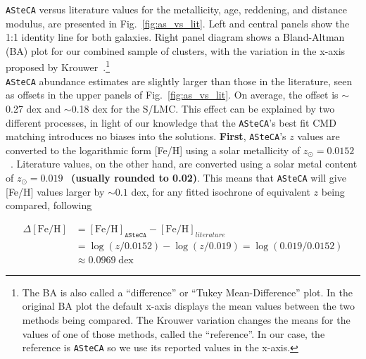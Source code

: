 \documentclass[referee]{aa}
\begin{document}
\texttt{ASteCA} versus literature values for the metallicity, age, reddening,
and distance modulus, are presented in Fig.~\ref{fig:as_vs_lit}. Left and
central panels show the 1:1 identity line for both galaxies.
%
Right panel diagram shows a Bland-Altman (BA) plot for our combined sample
of clusters, with the variation in the x-axis proposed by
Krouwer~\citep{Bland_1986,Krouwer_2008}.\footnote{The BA is also called a
``difference'' or ``Tukey Mean-Difference'' plot. In the original BA plot the
default x-axis displays the mean values between the two methods being compared.
The Krouwer variation changes the means for the values of one of those methods,
called the ``reference''. In our case, the reference is \texttt{ASteCA}
so we use its reported values in the x-axis.}\\
%

\texttt{ASteCA} abundance estimates are slightly larger than those in
the literature, seen as offsets in the upper panels of Fig.~\ref{fig:as_vs_lit}.
On average, the offset is $\sim$0.27 dex and $\sim$0.18 dex for the S/LMC.\@
%
This effect can be explained by two different processes, in light of our
knowledge that the \texttt{ASteCA}'s best fit CMD matching introduces no
biases into the solutions.
%
\textbf{First}, \texttt{ASteCA}'s $z$ values are converted to the logarithmic
form [Fe/H] using a solar metallicity of
$z_{\odot}{=}0.0152$~\citep{Bressan_2012}.
Literature values, on the other hand, are converted using a solar
metal content of $z_{\odot}{=}0.019$~\citep{Marigo_2008} \textbf{(usually
rounded to 0.02)}. This means that \texttt{ASteCA} will give [Fe/H] values
larger by ${\sim}0.1$ dex, for any fitted isochrone of equivalent $z$ being
compared, following

\begin{equation}
\begin{split}
\Delta\mathrm{[Fe/H]} & = \mathrm{[Fe/H]}_{\mathtt{ASteCA}} -
\mathrm{[Fe/H]}_{literature} \\
& = \log(z/0.0152) - \log(z/0.019) = \log(0.019/0.0152) \\
& \approx 0.0969 \;\mathrm{dex}
\end{split}
\label{eq:delta_feh}
\end{equation}
\end{document}
